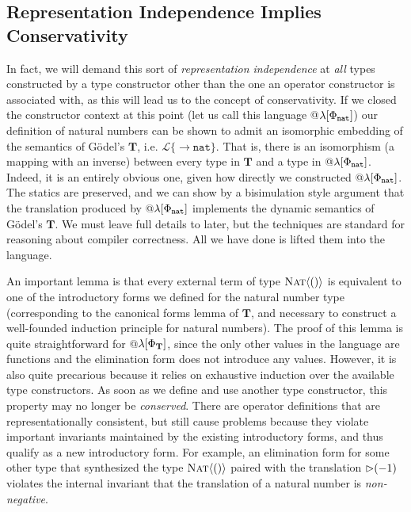 \subsection{Representation Independence Implies Conservativity}\label{repind}
In fact, we will demand this sort of \emph{representation independence} at \emph{all} types constructed by a type constructor other than the one an operator constructor is associated with, as this will lead us to the concept of conservativity. If we closed the constructor context at this point (let us call this language @$\lambda[\Phi_{\mathtt{nat}}]$) our definition of natural numbers can be shown to admit an isomorphic embedding of the semantics of G\"odel's $\mathbf{T}$, i.e. $\mathcal{L}\{\rightarrow \mathtt{nat}\}$. That is, there is an isomorphism (a mapping with an inverse) between every type in $\mathbf{T}$ and a type in @$\lambda[\Phi_{\mathtt{nat}}]$. Indeed, it is an entirely obvious one, given how directly we constructed @$\lambda[\Phi_{\mathtt{nat}}]$. The statics are  preserved, and we can show by a bisimulation style argument that the translation produced by @$\lambda[\Phi_{\mathtt{nat}}]$ implements the dynamic semantics of G\"odel's $\mathbf{T}$. We must leave full details to later, but the techniques are  standard for reasoning about compiler correctness. All we have done is lifted them into the language.%

An important lemma is that every  external term of type $\textsc{Nat}\langle()\rangle$ is equivalent to one of the introductory forms we defined for the natural number type  (corresponding to the canonical forms lemma of $\mathbf{T}$, and necessary to construct a well-founded induction principle for natural numbers). 
The proof of this lemma is quite straightforward for @$\lambda[\Phi_{\mathbf{T}}]$, since the only other values in the language are functions and the elimination form does not introduce any values. However, it is also quite precarious because it relies on exhaustive induction over the available type constructors. As soon as we define and use another type constructor, this property may no longer be \emph{conserved}. There are operator definitions that are representationally consistent, but still cause problems because they violate important invariants maintained by the existing introductory forms, and thus qualify as a new introductory form. For example, an elimination form for some other type that synthesized the type $\textsc{Nat}\langle()\rangle$ paired with the translation $\rhd(-1)$ violates the internal invariant that the translation of a natural number is \emph{non-negative}.

